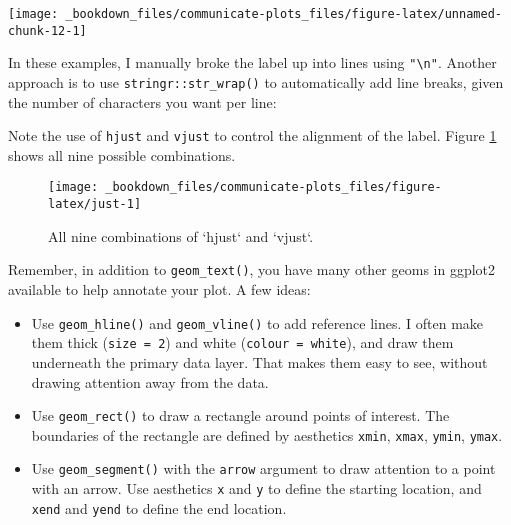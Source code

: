 \documentclass[]{book}
\newenvironment{Shaded}{\begin{snugshade}}{\end{snugshade}}
\newcommand{\KeywordTok}[1]{\textcolor[rgb]{0.13,0.29,0.53}{\textbf{{#1}}}}
\newcommand{\DataTypeTok}[1]{\textcolor[rgb]{0.13,0.29,0.53}{{#1}}}
\newcommand{\DecValTok}[1]{\textcolor[rgb]{0.00,0.00,0.81}{{#1}}}
\newcommand{\StringTok}[1]{\textcolor[rgb]{0.31,0.60,0.02}{{#1}}}
\newcommand{\CommentTok}[1]{\textcolor[rgb]{0.56,0.35,0.01}{\textit{{#1}}}}
\newcommand{\NormalTok}[1]{{#1}}
\begin{document}
\begin{center}\texttt{[image: \_bookdown\_files/communicate-plots\_files/figure-latex/unnamed-chunk-12-1]} \end{center}

In these examples, I manually broke the label up into lines using
\texttt{"\textbackslash{}n"}. Another approach is to use
\texttt{stringr::str\_wrap()} to automatically add line breaks, given
the number of characters you want per line:

\begin{Shaded}
\end{Shaded}

Note the use of \texttt{hjust} and \texttt{vjust} to control the
alignment of the label. Figure \ref{fig:just} shows all nine possible
combinations.

\begin{figure}

{\centering \texttt{[image: \_bookdown\_files/communicate-plots\_files/figure-latex/just-1]} 

}

\caption{All nine combinations of `hjust` and `vjust`.}\label{fig:just}
\end{figure}

Remember, in addition to \texttt{geom\_text()}, you have many other
geoms in ggplot2 available to help annotate your plot. A few ideas:

\begin{itemize}
\item
  Use \texttt{geom\_hline()} and \texttt{geom\_vline()} to add reference
  lines. I often make them thick (\texttt{size\ =\ 2}) and white
  (\texttt{colour\ =\ white}), and draw them underneath the primary data
  layer. That makes them easy to see, without drawing attention away
  from the data.
\item
  Use \texttt{geom\_rect()} to draw a rectangle around points of
  interest. The boundaries of the rectangle are defined by aesthetics
  \texttt{xmin}, \texttt{xmax}, \texttt{ymin}, \texttt{ymax}.
\item
  Use \texttt{geom\_segment()} with the \texttt{arrow} argument to draw
  attention to a point with an arrow. Use aesthetics \texttt{x} and
  \texttt{y} to define the starting location, and \texttt{xend} and
  \texttt{yend} to define the end location.
\end{itemize}
\end{document}
